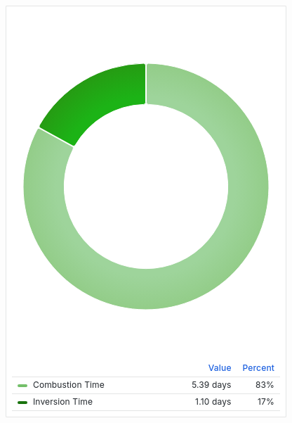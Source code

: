\documentclass{article}
\begin{document}
\includegraphics[width=\textwidth]{panel_0019-0005.png}
\end{document}

